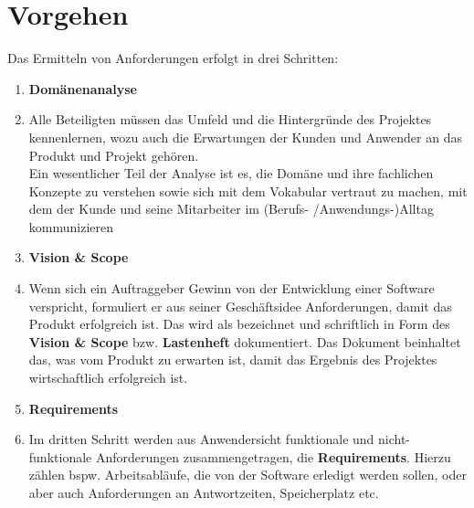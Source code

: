 \section{Vorgehen}

\noindent
Das Ermitteln von Anforderungen erfolgt in drei Schritten:

\begin{enumerate}
    \item \textbf{Domänenanalyse}
    \item[] Alle Beteiligten müssen das Umfeld und die Hintergründe des Projektes kennenlernen, wozu auch die Erwartungen
    der Kunden und Anwender an das Produkt und Projekt gehören.\\
    Ein wesentlicher Teil der Analyse ist es, die Domäne und ihre fachlichen Konzepte zu verstehen sowie sich mit dem Vokabular vertraut zu machen, mit dem der Kunde und seine Mitarbeiter im (Berufs- /Anwendungs-)Alltag kommunizieren
    \item \textbf{Vision \& Scope}
    \item[] Wenn sich ein Auftraggeber Gewinn von der Entwicklung einer Software verspricht, formuliert er aus seiner Geschäftsidee Anforderungen, damit das Produkt erfolgreich ist.
    Das wird als  bezeichnet und schriftlich in Form des \textbf{Vision \& Scope} bzw. \textbf{Lastenheft} dokumentiert.
    Das Dokument beinhaltet das, was vom Produkt zu erwarten ist, damit das Ergebnis des Projektes wirtschaftlich erfolgreich ist.
    \item \textbf{Requirements}
    \item[] Im dritten Schritt werden aus Anwendersicht funktionale und nicht-funktionale Anforderungen zusammengetragen, die \textbf{Requirements}.
    Hierzu zählen bspw. Arbeitsabläufe, die von der Software erledigt werden sollen, oder aber auch Anforderungen an Antwortzeiten, Speicherplatz etc.
\end{enumerate}

